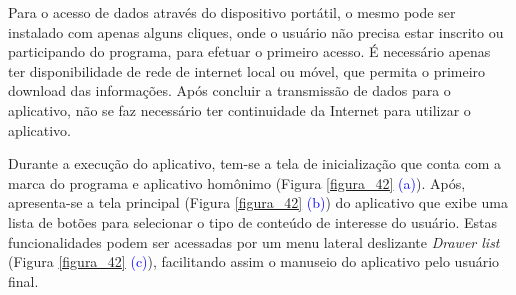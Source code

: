 Para o acesso de dados através do dispositivo portátil, o mesmo pode ser instalado com apenas alguns cliques, onde o usuário não precisa estar inscrito ou participando do programa, para efetuar o primeiro acesso. É necessário apenas ter disponibilidade de rede de internet local ou móvel, que permita o primeiro download das informações. Após concluir a transmissão de dados para o aplicativo, não se faz necessário ter continuidade da Internet para utilizar o aplicativo.

Durante a execução do aplicativo, tem-se a tela de inicialização que conta com a marca do programa e aplicativo homônimo (Figura \ref{figura_42} \textcolor{blue}{(a)}). 
Após, apresenta-se a tela principal (Figura \ref{figura_42} \textcolor{blue}{(b)}) do aplicativo que exibe uma lista de botões para selecionar o tipo de conteúdo de interesse do usuário. Estas funcionalidades podem ser acessadas por um menu lateral deslizante \textit{Drawer list} (Figura \ref{figura_42} \textcolor{blue}{(c)}), facilitando assim o manuseio do aplicativo pelo usuário final. 


